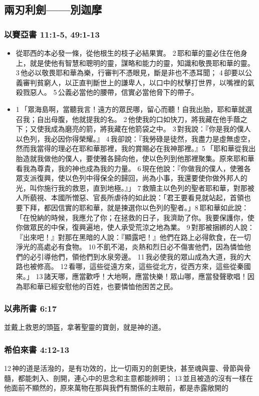 \subsection{兩刃利劍——別迦摩}

\subsubsection{以賽亞書 11:1-5, 49:1-13}
\begin{itemize} 
\itemsep-.25em
\item 從耶西的本必發一條，從他根生的枝子必結果實。 2 耶和華的靈必住在他身上，就是使他有智慧和聰明的靈，謀略和能力的靈，知識和敬畏耶和華的靈。 3 他必以敬畏耶和華為樂，行審判不憑眼見，斷是非也不憑耳聞； 4 卻要以公義審判貧窮人，以正直判斷世上的謙卑人，以口中的杖擊打世界，以嘴裡的氣殺戮惡人。 5 公義必當他的腰帶，信實必當他脅下的帶子。
\item 1 「眾海島啊，當聽我言！遠方的眾民哪，留心而聽！自我出胎，耶和華就選召我；自出母腹，他就提我的名。 2 他使我的口如快刀，將我藏在他手蔭之下；又使我成為磨亮的箭，將我藏在他箭袋之中。 3 對我說：『你是我的僕人以色列，我必因你得榮耀。』 4 我卻說：『我勞碌是徒然，我盡力是虛無虛空，然而我當得的理必在耶和華那裡，我的賞賜必在我神那裡。』5 「耶和華從我出胎造就我做他的僕人，要使雅各歸向他，使以色列到他那裡聚集。原來耶和華看我為尊貴，我的神也成為我的力量。 6 現在他說：『你做我的僕人，使雅各眾支派復興，使以色列中得保全的歸回，尚為小事，我還要使你做外邦人的光，叫你施行我的救恩，直到地極。』」 7 救贖主以色列的聖者耶和華，對那被人所藐視、本國所憎惡、官長所虐待的如此說：「君王要看見就站起，首領也要下拜，都因信實的耶和華，就是揀選你以色列的聖者。」8 耶和華如此說：「在悅納的時候，我應允了你；在拯救的日子，我濟助了你。我要保護你，使你做眾民的中保，復興遍地，使人承受荒涼之地為業。 9 對那被捆綁的人說：『出來吧！』對那在黑暗的人說：『顯露吧！』他們在路上必得飲食，在一切淨光的高處必有食物。 10 不飢不渴，炎熱和烈日必不傷害他們，因為憐恤他們的必引導他們，領他們到水泉旁邊。 11 我必使我的眾山成為大道，我的大路也被修高。 12 看哪，這些從遠方來，這些從北方，從西方來，這些從秦國來。」 13 諸天哪，應當歡呼！大地啊，應當快樂！眾山哪，應當發聲歌唱！因為耶和華已經安慰他的百姓，也要憐恤他困苦之民。
\end{itemize}

\subsubsection{以弗所書 6:17}
並戴上救恩的頭盔，拿著聖靈的寶劍，就是神的道。

\subsubsection{希伯來書 4:12-13}
12 神的道是活潑的，是有功效的，比一切兩刃的劍更快，甚至魂與靈、骨節與骨髓，都能刺入、剖開，連心中的思念和主意都能辨明； 13 並且被造的沒有一樣在他面前不顯然的，原來萬物在那與我們有關係的主眼前，都是赤露敞開的


